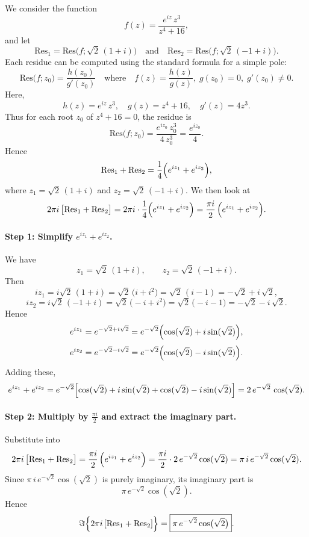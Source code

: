 \documentclass[12pt]{article}
\theoremstyle{definition} %
\theoremstyle{plain} %
\begin{document}
    We consider the function 
\[
f(z) = \frac{e^{iz}\,z^3}{z^4 + 16},
\]
and let
\[
\text{Res}_1 = \mathrm{Res}\bigl(f; \sqrt{2}\,(1 + i)\bigr)
\quad \text{and} \quad
\text{Res}_2 = \mathrm{Res}\bigl(f; \sqrt{2}\,(-1 + i)\bigr).
\]
Each residue can be computed using the standard formula for a simple pole:
\[
\mathrm{Res}\bigl(f; z_0\bigr)
= \frac{h(z_0)}{g'(z_0)}
\quad \text{where} \quad
f(z) = \frac{h(z)}{g(z)}, \; g(z_0) = 0, \; g'(z_0) \neq 0.
\]
Here,
\[
h(z) = e^{iz}\,z^3, \quad g(z) = z^4 + 16, \quad g'(z) = 4z^3.
\]
Thus for each root $z_0$ of $z^4 + 16 = 0$, the residue is
\[
\mathrm{Res}\bigl(f; z_0\bigr)
= \frac{e^{i z_0}\,z_0^3}{4\,z_0^3}
= \frac{e^{i z_0}}{4}.
\]
Hence
\[
\text{Res}_1 + \text{Res}_2 
= \frac{1}{4}\Bigl(e^{i z_1} + e^{i z_2}\Bigr),
\]
where $z_1 = \sqrt{2}\,(1 + i)$ and $z_2 = \sqrt{2}\,(-1 + i)$. We then look at
\[
2\pi i \,\bigl[\text{Res}_1 + \text{Res}_2 \bigr]
= 2\pi i \cdot \frac{1}{4}\Bigl(e^{i z_1} + e^{i z_2}\Bigr)
= \frac{\pi i}{2}\,\Bigl(e^{i z_1} + e^{i z_2}\Bigr).
\]

\paragraph{Step 1: Simplify $e^{i z_1} + e^{i z_2}$.}

We have
\[
z_1 = \sqrt{2}\,(1 + i), \qquad z_2 = \sqrt{2}\,(-1 + i).
\]
Then
\[
i z_1 = i \sqrt{2}\,(1 + i)
= \sqrt{2}\,\bigl(i + i^2\bigr)
= \sqrt{2}\,(i - 1)
= -\sqrt{2} + i\,\sqrt{2},
\]
\[
i z_2 = i \sqrt{2}\,(-1 + i)
= \sqrt{2}\,\bigl(-i + i^2\bigr)
= \sqrt{2}\,\bigl(-i - 1\bigr)
= -\sqrt{2} - i\,\sqrt{2}.
\]
Hence
\[
e^{i z_1}
= e^{-\sqrt{2} + i\sqrt{2}}
= e^{-\sqrt{2}}\Bigl(\cos(\sqrt{2}) + i\sin(\sqrt{2})\Bigr),
\]
\[
e^{i z_2}
= e^{-\sqrt{2} - i\sqrt{2}}
= e^{-\sqrt{2}}\Bigl(\cos(\sqrt{2}) - i\sin(\sqrt{2})\Bigr).
\]
Adding these,
\[
e^{i z_1} + e^{i z_2}
= e^{-\sqrt{2}} \Bigl[ 
  \cos(\sqrt{2}) + i\sin(\sqrt{2}) 
  + \cos(\sqrt{2}) - i\sin(\sqrt{2})
\Bigr]
= 2\,e^{-\sqrt{2}}\,\cos(\sqrt{2}).
\]

\paragraph{Step 2: Multiply by $\frac{\pi i}{2}$ and extract the imaginary part.}

Substitute into
\[
2\pi i \,\bigl[\text{Res}_1 + \text{Res}_2 \bigr]
= \frac{\pi i}{2}\,\Bigl(e^{i z_1} + e^{i z_2}\Bigr)
= \frac{\pi i}{2} \cdot 2\,e^{-\sqrt{2}}\cos(\sqrt{2})
= \pi\,i\,e^{-\sqrt{2}}\cos(\sqrt{2}).
\]
Since $\pi\,i\,e^{-\sqrt{2}}\cos(\sqrt{2})$ is purely imaginary, its imaginary part is
\[
\pi\,e^{-\sqrt{2}}\cos(\sqrt{2}).
\]
Hence
\[
\Im\Bigl\{2\pi i\,[\text{Res}_1+\text{Res}_2]\Bigr\}
= \boxed{\pi\,e^{-\sqrt{2}}\cos\bigl(\sqrt{2}\bigr)}.
\]
\end{document}
